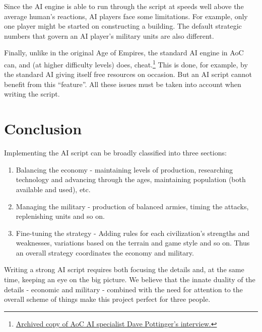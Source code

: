\documentclass[a4paper,12pt]{article}
\begin{document}
Since the AI engine is able to run through the script at speeds well above 
the average human's reactions, AI players face some limitations. For 
example, only one player might be started on constructing a building. The 
default strategic numbers that govern an AI player's military units are 
also different.

Finally, unlike in the original Age of Empires, the standard AI engine in 
AoC can, and (at higher difficulty levels) does, cheat.\footnote{\href{http://web.archive.org/web/20081013144438/http://www.microsoft.com/games/empires/behind_dave.htm}
{Archived copy of AoC AI specialist Dave Pottinger's interview.}} 
This is done, for example, by the standard AI giving itself free resources 
on occasion. But an AI script cannot benefit from this ``feature''. All 
these issues must be taken into account when writing the script.

\section*{Conclusion}
Implementing the AI script can be broadly classified into three sections:
\begin{enumerate}
	\item Balancing the economy - maintaining levels of production, 
	researching technology and advancing through the ages, maintaining 
	population (both available and used), etc.
	\item Managing the military - production of balanced armies, timing 
	the attacks, replenishing units and so on.
	\item Fine-tuning the strategy - Adding rules for each civilization's 
	strengths and weaknesses, variations based on the terrain and game 
	style and so on. 
	Thus an overall strategy coordinates the economy and military.
\end{enumerate}

Writing a strong AI script requires both focusing the details and, at the 
same time, keeping an eye on the big picture. We believe that the innate 
duality of the details - economic and military - combined with the need 
for attention to the overall scheme of things make this project perfect 
for three people.
\end{document}
